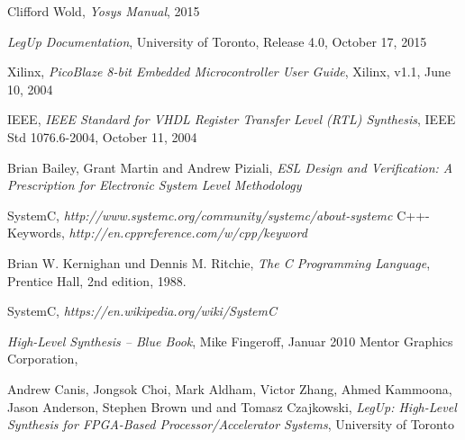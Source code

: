 \documentclass[oneside,a4paper]{article}
\begin{document}
\pagebreak
\begin{thebibliography}{9}
    Clifford Wold,
    \emph{Yosys Manual},
    2015

    \emph{LegUp Documentation},
    University of Toronto,
    Release 4.0,
    October 17, 2015

    Xilinx,
    \emph{PicoBlaze 8-bit Embedded Microcontroller User Guide},
    Xilinx,
    v1.1,
    June 10, 2004

    IEEE,
    \emph{IEEE Standard for VHDL Register Transfer Level (RTL) Synthesis},
    IEEE Std 1076.6-2004, October 11, 2004

    Brian Bailey,
    Grant Martin and Andrew Piziali,
    \emph{ESL Design and Verification: A Prescription for Electronic System Level Methodology}

    SystemC,
    \emph{http://www.systemc.org/community/systemc/about-systemc}
    C++-Keywords,
    \emph{http://en.cppreference.com/w/cpp/keyword}

    Brian W. Kernighan und Dennis M. Ritchie,
    \emph{The C Programming Language},
    Prentice Hall,
    2nd edition,
    1988.

    SystemC,
    \emph{https://en.wikipedia.org/wiki/SystemC}

    \emph{High-Level Synthesis -- Blue Book},
    Mike Fingeroff, Januar 2010
    Mentor Graphics Corporation,

    Andrew Canis,
    Jongsok Choi,
    Mark Aldham,
    Victor Zhang,
    Ahmed Kammoona,
    Jason Anderson,
    Stephen Brown und
    and Tomasz Czajkowski,
    \emph{LegUp: High-Level Synthesis for FPGA-Based Processor/Accelerator Systems},
    University of Toronto
\end{thebibliography}
\end{document}
